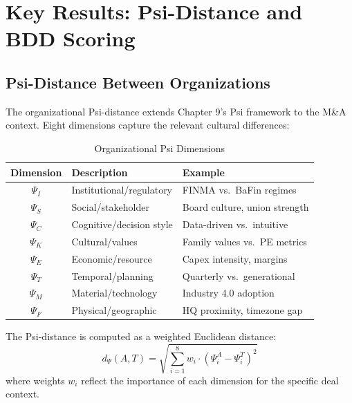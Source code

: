 \section{Key Results: Psi-Distance and BDD Scoring}
\label{sec:ma-results}

\subsection{Psi-Distance Between Organizations}

The organizational Psi-distance extends Chapter 9's Psi framework to the M\&A
context. Eight dimensions capture the relevant cultural differences:

\begin{table}[htbp]
\centering
\caption{Organizational Psi Dimensions}
\label{tab:ma-psi}
\begin{tabular}{cll}
\toprule
\textbf{Dimension} & \textbf{Description} & \textbf{Example} \\
\midrule
$\Psi_I$ & Institutional/regulatory & FINMA vs.\ BaFin regimes \\
$\Psi_S$ & Social/stakeholder       & Board culture, union strength \\
$\Psi_C$ & Cognitive/decision style  & Data-driven vs.\ intuitive \\
$\Psi_K$ & Cultural/values           & Family values vs.\ PE metrics \\
$\Psi_E$ & Economic/resource         & Capex intensity, margins \\
$\Psi_T$ & Temporal/planning         & Quarterly vs.\ generational \\
$\Psi_M$ & Material/technology       & Industry 4.0 adoption \\
$\Psi_F$ & Physical/geographic       & HQ proximity, timezone gap \\
\bottomrule
\end{tabular}
\end{table}

The Psi-distance is computed as a weighted Euclidean distance:
\begin{equation}
d_\Psi(A,T) = \sqrt{\sum_{i=1}^{8} w_i \cdot (\Psi_i^A - \Psi_i^T)^2}
\label{eq:ma-psi-full}
\end{equation}
where weights $w_i$ reflect the importance of each dimension for the specific
deal context.

